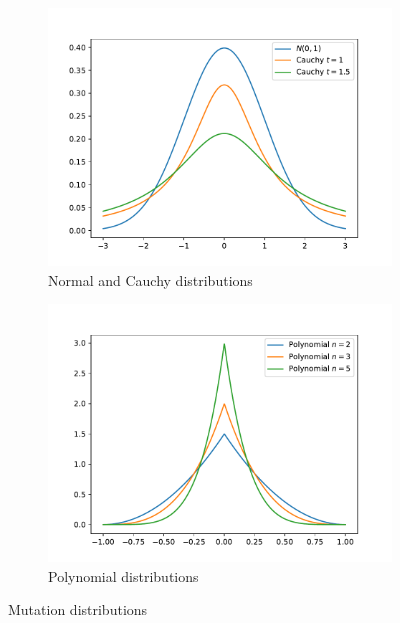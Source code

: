 \begin{figure}
    \begin{subfigure}[t]{0.45\textwidth}
        \includegraphics[width=\textwidth]{img/render_distributions_normalcauchy.pdf}
        \caption{Normal and Cauchy distributions}
        \label{fig:mutationdistributionnormalcacuchy}
    \end{subfigure}
    \hfill
    \begin{subfigure}[t]{0.45\textwidth}
        \includegraphics[width=\textwidth]{img/render_distributions_polynomial.pdf}
        \caption{Polynomial distributions}
        \label{fig:mutationdistributionpolynomial}
    \end{subfigure}
    \caption{Mutation distributions}
\end{figure}

